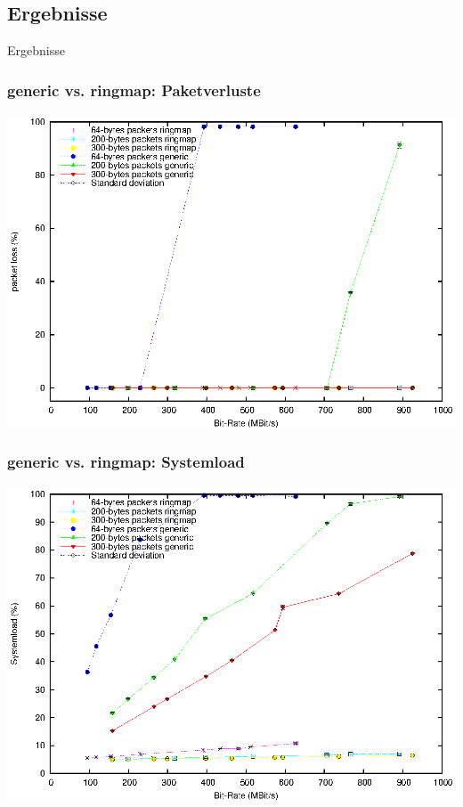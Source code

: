 \documentclass{beamer}
\begin{document}
\subsection*{Ergebnisse}
\begin{frame}
	\begin{center}
	\huge{Ergebnisse}
	\end{center}
\end{frame}
\begin{frame}
\frametitle{generic vs. ringmap: Paketverluste}
\begin{center}
\includegraphics [height=0.81\textheight]{plots/pktloss_generic_vs_ringmap_mbs.eps}
\end{center}
\end{frame}

\begin{frame}
\frametitle{generic vs. ringmap: Systemload}
\begin{center}
\includegraphics [height=0.81\textheight]{plots/sysload_generic_vs_ringmap_mbs.eps}
\end{center}
\end{frame}
\end{document}
